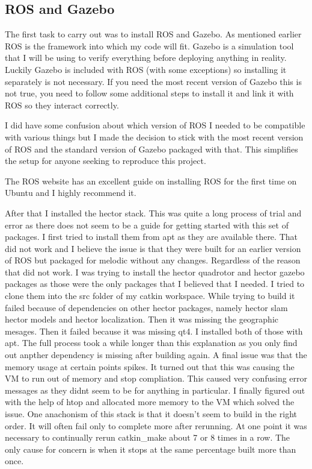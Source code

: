 \documentclass[]{../resources/final_report}
\begin{document}

\subsection{ROS and Gazebo}

The first task to carry out was to install ROS and Gazebo. As mentioned earlier ROS is the framework 
into which my code will fit. Gazebo is a simulation tool that I will be using to verify everything 
before deploying anything in reality. Luckily Gazebo is included with ROS (with some exceptions) so 
installing it separately is not necessary. If you need the most recent version of Gazebo this is not 
true, you need to follow some additional steps to install it and link it with ROS so they interact 
correctly.

I did have some confusion about which version of ROS I needed to be compatible with various things 
but I made the decision to stick with the most recent version of ROS and the standard version of 
Gazebo packaged with that. This simplifies the setup for anyone seeking to reproduce this project.

The ROS website\cite{melodic/installation/ubuntu} has an excellent guide on installing ROS for the 
first time on Ubuntu and I highly recommend it.


After that I installed the hector stack. This was quite a long process of trial and error as there 
does not seem to be a guide for getting started with this set of packages. I first tried to install 
them from apt as they are available there. That did not work and I believe the issue is that they 
were built for an earlier version of ROS but packaged for melodic without any changes. Regardless 
of the reason that did not work. I was trying to install the hector quadrotor and hector gazebo 
packages as those were the only packages that I believed that I needed. I tried to clone them into 
the src folder of my catkin workspace. While trying to build it failed because of dependencies on 
other hector packages, namely hector slam hector models and hector localization. Then it was missing 
the geographic mesages. Then it failed because it was missing qt4. I installed both of those with 
apt. The full process took a while longer than this explanation as you only find out anpther 
dependency is missing after building again. A final issue was that the memory usage at certain 
points spikes. It turned out that this was causing the VM to run out of memory and stop compliation. 
This caused very confusing error messages as they didnt seem to be for anything in particular. I 
finally figured out with the help of htop and allocated more memory to the VM which solved the issue. 
One anachonism of this stack is that it doesn't seem to build in the right order. It will often fail 
only to complete more after rerunning. At one point it was necessary to continually rerun catkin\_make 
about 7 or 8 times in a row. The only cause for concern is when it stops at the same percentage built more 
than once. 
\end{document}
